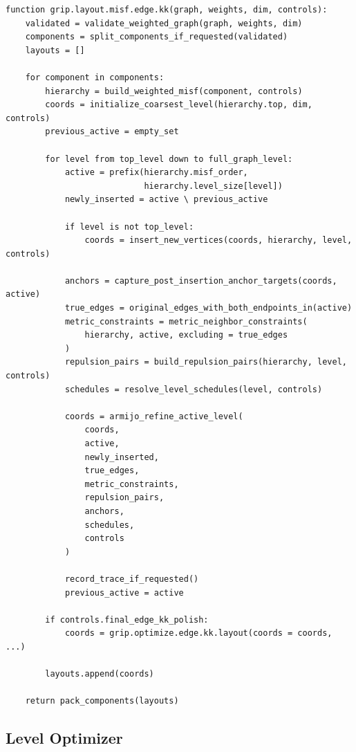 \documentclass[11pt]{article}
\begin{document}
\begin{verbatim}
function grip.layout.misf.edge.kk(graph, weights, dim, controls):
    validated = validate_weighted_graph(graph, weights, dim)
    components = split_components_if_requested(validated)
    layouts = []

    for component in components:
        hierarchy = build_weighted_misf(component, controls)
        coords = initialize_coarsest_level(hierarchy.top, dim, controls)
        previous_active = empty_set

        for level from top_level down to full_graph_level:
            active = prefix(hierarchy.misf_order,
                            hierarchy.level_size[level])
            newly_inserted = active \ previous_active

            if level is not top_level:
                coords = insert_new_vertices(coords, hierarchy, level, controls)

            anchors = capture_post_insertion_anchor_targets(coords, active)
            true_edges = original_edges_with_both_endpoints_in(active)
            metric_constraints = metric_neighbor_constraints(
                hierarchy, active, excluding = true_edges
            )
            repulsion_pairs = build_repulsion_pairs(hierarchy, level, controls)
            schedules = resolve_level_schedules(level, controls)

            coords = armijo_refine_active_level(
                coords,
                active,
                newly_inserted,
                true_edges,
                metric_constraints,
                repulsion_pairs,
                anchors,
                schedules,
                controls
            )

            record_trace_if_requested()
            previous_active = active

        if controls.final_edge_kk_polish:
            coords = grip.optimize.edge.kk.layout(coords = coords, ...)

        layouts.append(coords)

    return pack_components(layouts)
\end{verbatim}

\subsection{Level Optimizer}
\end{document}
